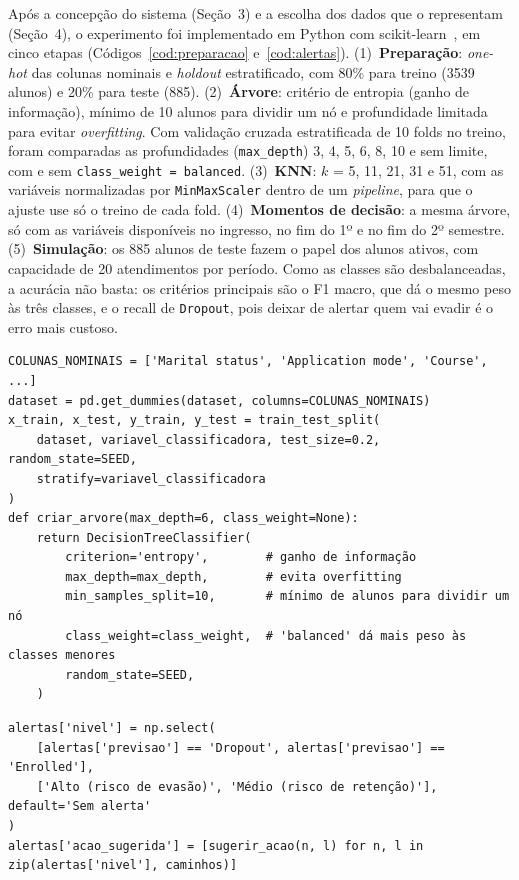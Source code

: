 \documentclass[runningheads]{llncs}
\begin{document}
Após a concepção do sistema (Seção~3) e a escolha dos dados que o representam
(Seção~4), o experimento foi implementado em Python com scikit-learn~\cite{sklearn}, em
cinco etapas (Códigos~\ref{cod:preparacao} e~\ref{cod:alertas}). (1)~\textbf{Preparação}:
\emph{one-hot} das colunas nominais e \emph{holdout} estratificado, com 80\% para treino
(3539 alunos) e 20\% para teste (885).
(2)~\textbf{Árvore}: critério de entropia (ganho de informação), mínimo de 10 alunos
para dividir um nó e profundidade limitada para evitar \emph{overfitting}. Com validação
cruzada estratificada de 10 folds no treino, foram comparadas as profundidades
(\texttt{max\_depth}) 3, 4, 5, 6, 8, 10 e sem limite, com e sem
\texttt{class\_weight = balanced}. (3)~\textbf{KNN}: $k$ = 5, 11, 21, 31 e 51, com as
variáveis normalizadas por \texttt{MinMaxScaler}
dentro de um \emph{pipeline}, para que o ajuste use só o treino de cada fold.
(4)~\textbf{Momentos de decisão}: a mesma árvore, só com as variáveis disponíveis no
ingresso, no fim do 1º e no fim do 2º semestre. (5)~\textbf{Simulação}: os 885 alunos
de teste fazem o papel dos alunos ativos, com capacidade de 20 atendimentos por período.
Como as classes são desbalanceadas, a acurácia não basta: os critérios principais são o
F1 macro, que dá o mesmo peso às três classes, e o recall de \texttt{Dropout}, pois
deixar de alertar quem vai evadir é o erro mais custoso.

\begin{lstlisting}[basicstyle=\ttfamily\scriptsize, caption={Preparação dos dados e criação da árvore (trechos das seções 2 e 3 do \texttt{projeto.py}).}, label={cod:preparacao}]
COLUNAS_NOMINAIS = ['Marital status', 'Application mode', 'Course', ...]
dataset = pd.get_dummies(dataset, columns=COLUNAS_NOMINAIS)
x_train, x_test, y_train, y_test = train_test_split(
    dataset, variavel_classificadora, test_size=0.2, random_state=SEED,
    stratify=variavel_classificadora
)
def criar_arvore(max_depth=6, class_weight=None):
    return DecisionTreeClassifier(
        criterion='entropy',        # ganho de informação
        max_depth=max_depth,        # evita overfitting
        min_samples_split=10,       # mínimo de alunos para dividir um nó
        class_weight=class_weight,  # 'balanced' dá mais peso às classes menores
        random_state=SEED,
    )
\end{lstlisting}

\begin{lstlisting}[basicstyle=\ttfamily\scriptsize, caption={Níveis de alerta e ação sugerida (trecho da seção 7 do \texttt{projeto.py}).}, label={cod:alertas}]
alertas['nivel'] = np.select(
    [alertas['previsao'] == 'Dropout', alertas['previsao'] == 'Enrolled'],
    ['Alto (risco de evasão)', 'Médio (risco de retenção)'], default='Sem alerta'
)
alertas['acao_sugerida'] = [sugerir_acao(n, l) for n, l in zip(alertas['nivel'], caminhos)]
\end{lstlisting}
\end{document}
